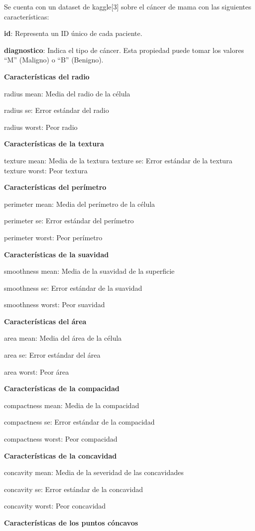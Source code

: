 \documentclass[a4paper,10pt,twocolumn]{article}
\begin{document}
Se cuenta con un dataset de kaggle[3] sobre el cáncer de mama con las siguientes  características: 


\textbf{id}: Representa un ID único de cada paciente.

\textbf{diagnostico}: Indica el tipo de cáncer. Esta propiedad puede tomar los valores “M” (Maligno) o “B” (Benigno).

\textbf{Características del radio}

radius mean: Media del radio de la célula

radius se: Error estándar del radio

radius worst: Peor radio

\textbf{Características de la textura}

texture mean: Media de la textura
texture se: Error estándar de la textura
texture worst: Peor textura

\textbf{Características del perímetro}

perimeter mean: Media del perímetro de la célula

perimeter se: Error estándar del perímetro

perimeter worst: Peor perímetro

\textbf{Características de la suavidad}

smoothness mean: Media de la suavidad de la superficie

smoothness se: Error estándar de la suavidad

smoothness worst: Peor suavidad

\textbf{Características del área}

area mean: Media del área de la célula

area se: Error estándar del área

area worst: Peor área

\textbf{Características de la compacidad}

compactness mean: Media de la compacidad 

compactness se: Error estándar de la compacidad

compactness worst: Peor compacidad

\textbf{Características de la concavidad}

concavity mean: Media de la severidad de las concavidades

concavity se: Error estándar de la concavidad

concavity worst: Peor concavidad

\textbf{Características de los puntos cóncavos}
\end{document}
